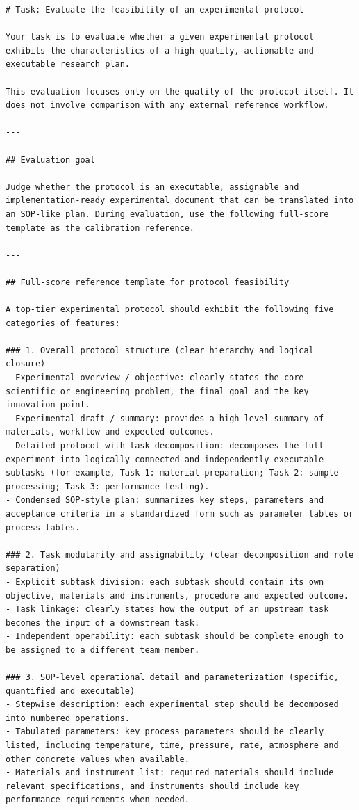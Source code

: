 \begin{lstlisting}[style=jsonstyle]
# Task: Evaluate the feasibility of an experimental protocol

Your task is to evaluate whether a given experimental protocol exhibits the characteristics of a high-quality, actionable and executable research plan.

This evaluation focuses only on the quality of the protocol itself. It does not involve comparison with any external reference workflow.

---

## Evaluation goal

Judge whether the protocol is an executable, assignable and implementation-ready experimental document that can be translated into an SOP-like plan. During evaluation, use the following full-score template as the calibration reference.

---

## Full-score reference template for protocol feasibility

A top-tier experimental protocol should exhibit the following five categories of features:

### 1. Overall protocol structure (clear hierarchy and logical closure)
- Experimental overview / objective: clearly states the core scientific or engineering problem, the final goal and the key innovation point.
- Experimental draft / summary: provides a high-level summary of materials, workflow and expected outcomes.
- Detailed protocol with task decomposition: decomposes the full experiment into logically connected and independently executable subtasks (for example, Task 1: material preparation; Task 2: sample processing; Task 3: performance testing).
- Condensed SOP-style plan: summarizes key steps, parameters and acceptance criteria in a standardized form such as parameter tables or process tables.

### 2. Task modularity and assignability (clear decomposition and role separation)
- Explicit subtask division: each subtask should contain its own objective, materials and instruments, procedure and expected outcome.
- Task linkage: clearly states how the output of an upstream task becomes the input of a downstream task.
- Independent operability: each subtask should be complete enough to be assigned to a different team member.

### 3. SOP-level operational detail and parameterization (specific, quantified and executable)
- Stepwise description: each experimental step should be decomposed into numbered operations.
- Tabulated parameters: key process parameters should be clearly listed, including temperature, time, pressure, rate, atmosphere and other concrete values when available.
- Materials and instrument list: required materials should include relevant specifications, and instruments should include key performance requirements when needed.


\end{lstlisting}
